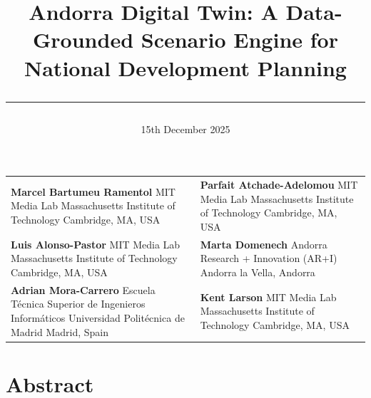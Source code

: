 \documentclass{article}
\title{\textbf{Andorra Digital Twin: A Data-Grounded Scenario Engine for National Development Planning}\\[0.1em]
{\normalfont\rule{0.6\textwidth}{0.4pt}}}
\date{15th December 2025}
\author{}
\begin{document}
\maketitle

\begin{center}
\small
\begin{tabular}{@{}>{\centering\arraybackslash}p{}@{\hspace{0.08\textwidth}}>{\centering\arraybackslash}p{}@{}}
  \textbf{Marcel Bartumeu Ramentol}\newline
  MIT Media Lab\newline
  Massachusetts Institute of Technology\newline
  Cambridge, MA, USA
  &
  \textbf{Parfait Atchade-Adelomou}\newline
  MIT Media Lab\newline
  Massachusetts Institute of Technology\newline
  Cambridge, MA, USA
  \\[1.2em]
  \textbf{Luis Alonso-Pastor}\newline
  MIT Media Lab\newline
  Massachusetts Institute of Technology\newline
  Cambridge, MA, USA
  &
  \textbf{Marta Domenech}\newline
  Andorra Research + Innovation (AR+I)\newline
  Andorra la Vella, Andorra
  \\[1.2em]
  \textbf{Adrian Mora-Carrero}\newline
  Escuela T\'ecnica Superior de Ingenieros Inform\'aticos\newline
  Universidad Polit\'ecnica de Madrid\newline
  Madrid, Spain
  &
  \textbf{Kent Larson}\newline
  MIT Media Lab\newline
  Massachusetts Institute of Technology\newline
  Cambridge, MA, USA
\end{tabular}
\end{center}

\vspace{1.5em}

\section{Abstract}
\end{document}
